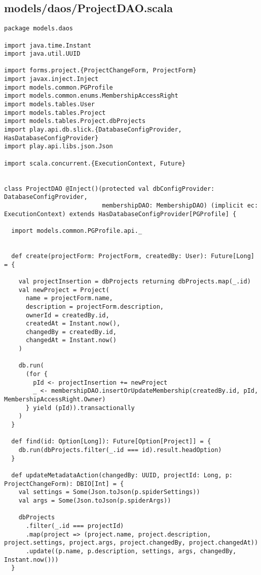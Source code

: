 \subsection{models/daos/ProjectDAO.scala}
\begin{lstlisting}
package models.daos

import java.time.Instant
import java.util.UUID

import forms.project.{ProjectChangeForm, ProjectForm}
import javax.inject.Inject
import models.common.PGProfile
import models.common.enums.MembershipAccessRight
import models.tables.User
import models.tables.Project
import models.tables.Project.dbProjects
import play.api.db.slick.{DatabaseConfigProvider, HasDatabaseConfigProvider}
import play.api.libs.json.Json

import scala.concurrent.{ExecutionContext, Future}


class ProjectDAO @Inject()(protected val dbConfigProvider: DatabaseConfigProvider,
                           membershipDAO: MembershipDAO) (implicit ec: ExecutionContext) extends HasDatabaseConfigProvider[PGProfile] {

  import models.common.PGProfile.api._


  def create(projectForm: ProjectForm, createdBy: User): Future[Long] = {

    val projectInsertion = dbProjects returning dbProjects.map(_.id)
    val newProject = Project(
      name = projectForm.name,
      description = projectForm.description,
      ownerId = createdBy.id,
      createdAt = Instant.now(),
      changedBy = createdBy.id,
      changedAt = Instant.now()
    )

    db.run(
      (for {
        pId <- projectInsertion += newProject
        _ <- membershipDAO.insertOrUpdateMembership(createdBy.id, pId, MembershipAccessRight.Owner)
      } yield (pId)).transactionally
    )
  }

  def find(id: Option[Long]): Future[Option[Project]] = {
    db.run(dbProjects.filter(_.id === id).result.headOption)
  }

  def updateMetadataAction(changedBy: UUID, projectId: Long, p: ProjectChangeForm): DBIO[Int] = {
    val settings = Some(Json.toJson(p.spiderSettings))
    val args = Some(Json.toJson(p.spiderArgs))

    dbProjects
      .filter(_.id === projectId)
      .map(project => (project.name, project.description, project.settings, project.args, project.changedBy, project.changedAt))
      .update((p.name, p.description, settings, args, changedBy, Instant.now()))
  }


\end{lstlisting}

